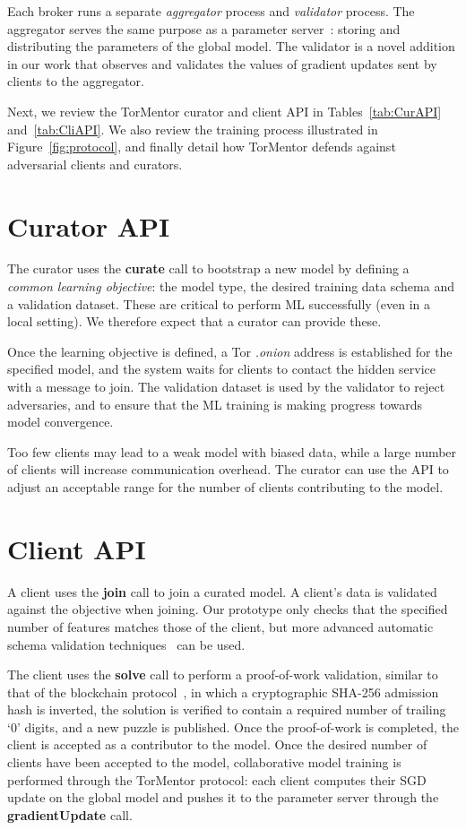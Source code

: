 Each broker runs a separate \emph{aggregator} process and 
\emph{validator} process. The aggregator serves the same purpose as a
parameter server~\cite{Li:2014}: storing and distributing the
parameters of the global model. The validator is a novel addition in
our work that observes and validates the values of gradient updates
sent by clients to the aggregator.

Next, we review the TorMentor curator and client \ac{API} in 
Tables~\ref{tab:CurAPI} and~\ref{tab:CliAPI}. We also review the
training process illustrated in Figure~\ref{fig:protocol}, and finally
detail how TorMentor defends against adversarial clients and curators.

\section{Curator API}

The curator uses the \textbf{curate} call to bootstrap a new model by defining
a \emph{common learning objective}: the model type, the desired
training data schema and a validation dataset. These are critical to
perform ML successfully (even in a local setting). We therefore expect
that a curator can provide these.

Once the learning objective is defined, a Tor \textit{.onion} address
is established for the specified model, and the system waits for
clients to contact the hidden service with a message to join. The
validation dataset is used by the validator to reject adversaries, and
to ensure that the ML training is making progress towards model
convergence.

Too few clients may lead to a weak model with biased data, while a
large number of clients will increase communication overhead. The
curator can use the API to adjust an acceptable range for the number of
clients contributing to the model.

\section{Client API} 

A client uses the \textbf{join} call to join a curated model. A
client's data is validated against the objective when joining. Our
prototype only checks that the specified number of features matches
those of the client, but more advanced automatic schema validation
techniques~\cite{Rahm:2001} can be used.

The client uses the \textbf{solve} call to perform a proof-of-work
validation, similar to that of the blockchain 
protocol~\cite{Nakamoto:2009}, in which a cryptographic SHA-256
admission hash is inverted, the solution is verified to contain
a required number of trailing `0' digits, and a new puzzle is
published. Once the proof-of-work is completed, the client is accepted
as a contributor to the model. Once the desired number of clients have
been accepted to the model, collaborative model training is performed
through the TorMentor protocol: each client computes their SGD update
on the global model and pushes it to the parameter server through the 
\textbf{gradientUpdate} call.

